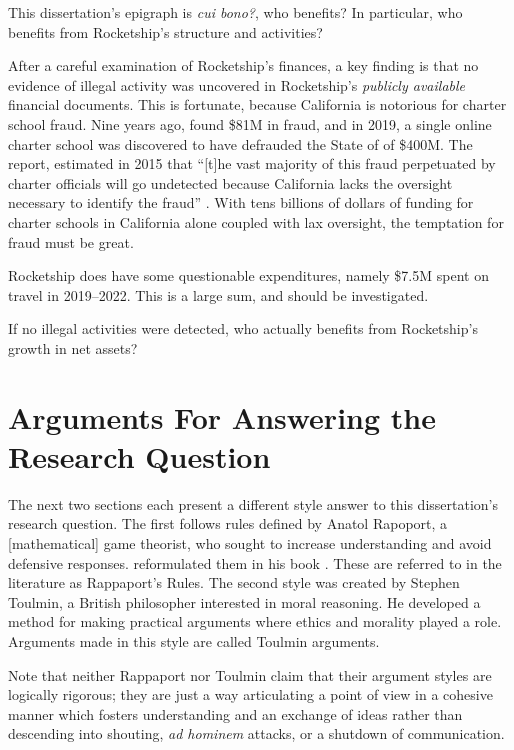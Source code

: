 This dissertation's epigraph is \textit{cui bono?}, who benefits? In particular, who benefits from Rocketship's structure 
and activities?

After a careful examination of Rocketship's finances, a key finding is that no evidence of illegal activity was uncovered in Rocketship's \textit{publicly available} financial documents. This is fortunate, because California is notorious for charter school fraud. Nine years ago, \textcite{CPD2015} found \$81M in fraud, and in 2019, a single online charter school was discovered to have defrauded the State of  of \$400M. The report,  estimated in 2015 that ``[t]he vast majority of this fraud perpetuated by charter officials will go undetected because California lacks the oversight necessary to identify the fraud'' \parencite[2]{CPD2015}. With tens billions of dollars of funding for charter schools in California alone coupled with lax oversight, the temptation for fraud must be great. 

Rocketship does have some questionable expenditures, namely \$7.5M spent on travel in 2019–2022. This is a large sum, and should be investigated.

If no illegal activities were detected,  who actually benefits from Rocketship's growth in net assets?

\section{Arguments For Answering the Research Question}\label{sec:appr-answ-rese-quest}\indent

The next two sections each present a different style answer to this dissertation's research question. The first follows rules defined by Anatol Rapoport, a [mathematical] game theorist, who sought to increase understanding and avoid defensive responses.  reformulated them in his book  \parencite{Dennett2013}. These are referred to in the literature as Rappaport's Rules. The second style was created by Stephen Toulmin, a British philosopher interested in moral reasoning. He developed a method for making practical arguments where ethics and morality played a role. Arguments made in this style are called Toulmin arguments. %

Note that neither Rappaport nor Toulmin claim that their argument styles are logically rigorous; they are just a way articulating a point of view in a cohesive manner which fosters understanding and an exchange of ideas rather than descending into shouting, \textit{ad hominem} attacks, or a shutdown of communication.

